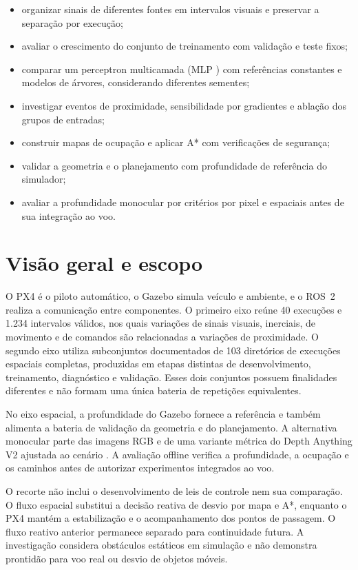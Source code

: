 \begin{itemize}
    \item organizar sinais de diferentes fontes em intervalos visuais e preservar a separação por execução;
    \item avaliar o crescimento do conjunto de treinamento com validação e teste fixos;
    \item comparar um perceptron multicamada (MLP \cite{Rumelhart1986}) com referências constantes e modelos de árvores, considerando diferentes sementes;
    \item investigar eventos de proximidade, sensibilidade por gradientes e ablação dos grupos de entradas;
    \item construir mapas de ocupação e aplicar A* com verificações de segurança;
    \item validar a geometria e o planejamento com profundidade de referência do simulador;
    \item avaliar a profundidade monocular por critérios por pixel e espaciais antes de sua integração ao voo.
\end{itemize}

\section{Visão geral e escopo}

O PX4 é o piloto automático, o Gazebo simula veículo e ambiente, e o ROS~2 realiza a comunicação entre componentes. O primeiro eixo reúne 40 execuções e 1.234 intervalos válidos, nos quais variações de sinais visuais, inerciais, de movimento e de comandos são relacionadas a variações de proximidade. O segundo eixo utiliza subconjuntos documentados de 103 diretórios de execuções espaciais completas, produzidas em etapas distintas de desenvolvimento, treinamento, diagnóstico e validação. Esses dois conjuntos possuem finalidades diferentes e não formam uma única bateria de repetições equivalentes.

No eixo espacial, a profundidade do Gazebo fornece a referência e também alimenta a bateria de validação da geometria e do planejamento. A alternativa monocular parte das imagens RGB e de uma variante métrica do Depth Anything V2 ajustada ao cenário \cite{DepthAnythingV2}. A avaliação offline verifica a profundidade, a ocupação e os caminhos antes de autorizar experimentos integrados ao voo.

O recorte não inclui o desenvolvimento de leis de controle nem sua comparação. O fluxo espacial substitui a decisão reativa de desvio por mapa e A*, enquanto o PX4 mantém a estabilização e o acompanhamento dos pontos de passagem. O fluxo reativo anterior permanece separado para continuidade futura. A investigação considera obstáculos estáticos em simulação e não demonstra prontidão para voo real ou desvio de objetos móveis.

